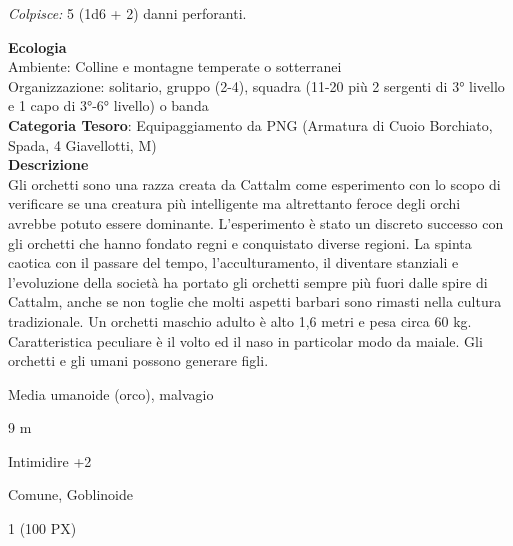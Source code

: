 \begin{multicols}{2}
{\emph{Colpisce:} 5 (1d6 + 2) danni perforanti.

\textbf{Ecologia}\\
Ambiente: Colline e montagne temperate o sotterranei\\
Organizzazione: solitario, gruppo (2-4), squadra (11-20 più 2 sergenti di 3° livello e 1 capo di 3°-6° livello) o banda \\
\textbf{Categoria Tesoro}: Equipaggiamento da PNG (Armatura di Cuoio Borchiato, Spada, 4 Giavellotti, M)\\
\textbf{Descrizione}\\
Gli orchetti sono una razza creata da Cattalm come esperimento con lo scopo di verificare se una creatura più intelligente ma altrettanto feroce degli orchi avrebbe potuto essere dominante.
L'esperimento è stato un discreto successo con gli orchetti che hanno fondato regni e conquistato diverse regioni. La spinta caotica con il passare del tempo, l'acculturamento, il diventare stanziali e l'evoluzione della società ha portato gli orchetti sempre più fuori dalle spire di Cattalm, anche se non toglie che molti aspetti barbari sono rimasti nella cultura tradizionale.
Un orchetti maschio adulto è alto 1,6 metri e pesa circa 60 kg. Caratteristica peculiare è il volto ed il naso in particolar modo da maiale. Gli orchetti e gli umani possono generare figli.

\begin{description}[noitemsep, topsep=0pt, parsep=0pt, partopsep=0pt, itemsep=1pt, leftmargin=2.35cm,  labelwidth=2.2cm, itemindent=0cm, listparindent=0pt] %
\setlength{\baselineskip}{10pt}
\item[\textbf{Taglia/Tipo}] Media umanoide (orco), malvagio
\item[\textbf{Caratt.}] 
\item[\textbf{Punti Ferita}] 
\item[\textbf{Movimento}] 9 m
\item[\textbf{Tiri Salvez.}] 
\item[\textbf{Comp.}] Intimidire +2
\item[\textbf{Sensi}] 
\item[\textbf{Linguaggi}] Comune, Goblinoide
\item[\textbf{Sfida}] 1 (100 PX)
\end{description}
\smallskip

}
\end{multicols}
